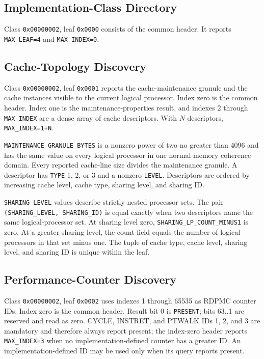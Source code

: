 

\subsection{Implementation-Class Directory}
Class \texttt{0x00000002}, leaf \texttt{0x0000} consists of the common header. It reports
\texttt{MAX\_LEAF=4} and \texttt{MAX\_INDEX=0}.

\subsection{Cache-Topology Discovery}
Class \texttt{0x00000002}, leaf \texttt{0x0001} reports the cache-maintenance granule and the cache instances visible
to the current logical processor. Index zero is the common header. Index one is the maintenance-properties result,
and indexes 2 through \texttt{MAX\_INDEX} are a dense array of cache descriptors. With $N$ descriptors,
\texttt{MAX\_INDEX=1+N}.



\texttt{MAINTENANCE\_GRANULE\_BYTES} is a nonzero power of two no greater than 4096 and has the same value on every
logical processor in one normal-memory coherence domain. Every reported cache-line size divides the maintenance
granule. A descriptor has \texttt{TYPE} 1, 2, or 3 and a nonzero \texttt{LEVEL}. Descriptors are
ordered by increasing cache level, cache type, sharing level, and sharing ID.

\texttt{SHARING\_LEVEL} values describe strictly nested processor sets. The pair
\texttt{(SHARING\_LEVEL, SHARING\_ID)} is equal exactly when two descriptors name the same logical-processor set.
At sharing level zero, \texttt{SHARING\_LP\_COUNT\_MINUS1} is zero. At a greater sharing level, the count field
equals the number of logical processors in that set minus one. The tuple of cache type, cache level, sharing level,
and sharing ID is unique within the leaf.

\subsection{Performance-Counter Discovery}\label{section:performance-counter-discovery}
Class \texttt{0x00000002}, leaf \texttt{0x0002} uses indexes 1 through 65535 as RDPMC counter IDs. Index zero is the
common header. Result bit 0 is \texttt{PRESENT}; bits 63..1 are reserved and read as zero. CYCLE, INSTRET, and PTWALK
IDs 1, 2, and 3 are mandatory and therefore always report present; the index-zero header reports
\texttt{MAX\_INDEX=3} when no implementation-defined counter has a greater ID. An implementation-defined ID may be
used only when its query reports present.

